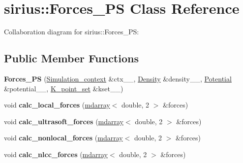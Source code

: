\hypertarget{classsirius_1_1_forces___p_s}{}\section{sirius\+:\+:Forces\+\_\+\+P\+S Class Reference}
\label{classsirius_1_1_forces___p_s}


Collaboration diagram for sirius\+:\+:Forces\+\_\+\+P\+S\+:
\subsection*{Public Member Functions}
\begin{DoxyCompactItemize}
\item 
\hypertarget{classsirius_1_1_forces___p_s_a6e55a65c083e301c7a16a34e71e74ce8}{}{\bfseries Forces\+\_\+\+P\+S} (\hyperlink{classsirius_1_1_simulation__context}{Simulation\+\_\+context} \&ctx\+\_\+\+\_\+, \hyperlink{classsirius_1_1_density}{Density} \&density\+\_\+\+\_\+, \hyperlink{classsirius_1_1_potential}{Potential} \&potential\+\_\+\+\_\+, \hyperlink{classsirius_1_1_k__point__set}{K\+\_\+point\+\_\+set} \&kset\+\_\+\+\_\+)\label{classsirius_1_1_forces___p_s_a6e55a65c083e301c7a16a34e71e74ce8}

\item 
\hypertarget{classsirius_1_1_forces___p_s_ae45e6b752095ed6152cd29fedffd4718}{}void {\bfseries calc\+\_\+local\+\_\+forces} (\hyperlink{classsddk_1_1mdarray}{mdarray}$<$ double, 2 $>$ \&forces)\label{classsirius_1_1_forces___p_s_ae45e6b752095ed6152cd29fedffd4718}

\item 
\hypertarget{classsirius_1_1_forces___p_s_ad28884e2720ca9063a8849ecab49471e}{}void {\bfseries calc\+\_\+ultrasoft\+\_\+forces} (\hyperlink{classsddk_1_1mdarray}{mdarray}$<$ double, 2 $>$ \&forces)\label{classsirius_1_1_forces___p_s_ad28884e2720ca9063a8849ecab49471e}

\item 
\hypertarget{classsirius_1_1_forces___p_s_a4f1305d964636380c6c26116840ec253}{}void {\bfseries calc\+\_\+nonlocal\+\_\+forces} (\hyperlink{classsddk_1_1mdarray}{mdarray}$<$ double, 2 $>$ \&forces)\label{classsirius_1_1_forces___p_s_a4f1305d964636380c6c26116840ec253}

\item 
\hypertarget{classsirius_1_1_forces___p_s_a1010fdb76063648468b3e19430c0b009}{}void {\bfseries calc\+\_\+nlcc\+\_\+forces} (\hyperlink{classsddk_1_1mdarray}{mdarray}$<$ double, 2 $>$ \&forces)\label{classsirius_1_1_forces___p_s_a1010fdb76063648468b3e19430c0b009}


\end{DoxyCompactItemize}
